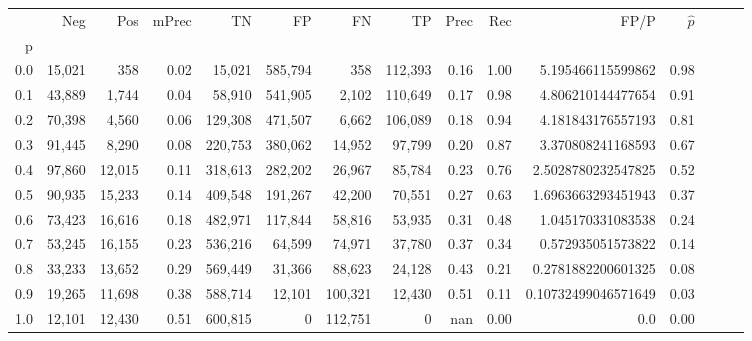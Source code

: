 \begin{tabular}{rrrrrrrrrrrrrrr}
\toprule
{} &     Neg &     Pos & mPrec &       TN &       FP &       FN &       TP &  Prec &   Rec &                 FP/P & $\hat{p}$ \\
p   &         &         &       &          &          &          &          &       &       &                      &           \\
\midrule
0.0 &  15,021 &     358 &  0.02 &   15,021 &  585,794 &      358 &  112,393 &  0.16 &  1.00 &    5.195466115599862 &      0.98 \\
0.1 &  43,889 &   1,744 &  0.04 &   58,910 &  541,905 &    2,102 &  110,649 &  0.17 &  0.98 &    4.806210144477654 &      0.91 \\
0.2 &  70,398 &   4,560 &  0.06 &  129,308 &  471,507 &    6,662 &  106,089 &  0.18 &  0.94 &    4.181843176557193 &      0.81 \\
0.3 &  91,445 &   8,290 &  0.08 &  220,753 &  380,062 &   14,952 &   97,799 &  0.20 &  0.87 &    3.370808241168593 &      0.67 \\
0.4 &  97,860 &  12,015 &  0.11 &  318,613 &  282,202 &   26,967 &   85,784 &  0.23 &  0.76 &   2.5028780232547825 &      0.52 \\
0.5 &  90,935 &  15,233 &  0.14 &  409,548 &  191,267 &   42,200 &   70,551 &  0.27 &  0.63 &   1.6963663293451943 &      0.37 \\
0.6 &  73,423 &  16,616 &  0.18 &  482,971 &  117,844 &   58,816 &   53,935 &  0.31 &  0.48 &    1.045170331083538 &      0.24 \\
0.7 &  53,245 &  16,155 &  0.23 &  536,216 &   64,599 &   74,971 &   37,780 &  0.37 &  0.34 &    0.572935051573822 &      0.14 \\
0.8 &  33,233 &  13,652 &  0.29 &  569,449 &   31,366 &   88,623 &   24,128 &  0.43 &  0.21 &   0.2781882200601325 &      0.08 \\
0.9 &  19,265 &  11,698 &  0.38 &  588,714 &   12,101 &  100,321 &   12,430 &  0.51 &  0.11 &  0.10732499046571649 &      0.03 \\
1.0 &  12,101 &  12,430 &  0.51 &  600,815 &        0 &  112,751 &        0 &   nan &  0.00 &                  0.0 &      0.00 \\
\bottomrule
\end{tabular}
